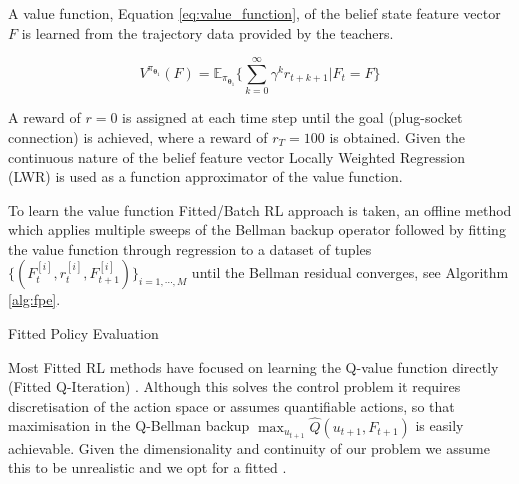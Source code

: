 \documentclass[final,5p,times,twocolumn]{elsarticle}
\makeatletter
\newcommand{\B}{b}
\newcommand{\Param}{\boldsymbol{\theta}}
\newcommand{\removelatexerror}{\let\@latex@error\@gobble}
\makeatother
\begin{document}
A value function, Equation \ref{eq:value_function}, of the belief state feature vector $F$ is  learned from the 
trajectory data provided by the teachers.

\begin{equation}\label{eq:value_function}
  V^{\pi_{\Param_1}}(F) = \mathbb{E}_{\pi_{\Param_1}}\Bigg\{  \sum^{\infty}_{k=0} \gamma^k r_{t+k+1} \Bigg\lvert  F_t=F\Bigg\}
\end{equation}

A reward of ${r=0}$ is assigned at each time step until the goal (plug-socket connection) is achieved, where a 
reward of $r_{T}=100$ is obtained. Given the continuous nature of the belief feature vector Locally Weighted Regression
(LWR) \cite{Atkeson97locallyweighted}  is used as a function approximator of the value function.

To learn the value function Fitted/Batch RL approach is taken\cite{EGW05}, an offline method which applies multiple 
sweeps of the Bellman backup operator followed by fitting the value function through regression to a dataset of 
tuples $\{(F^{[i]}_t,r^{[i]}_t,F^{[i]}_{t+1})\}_{i=1,\cdots,M}$ until the Bellman residual 
converges, see Algorithm \ref{alg:fpe}.

\begin{center}
\begin{minipage}{\linewidth}
\removelatexerror%
\begin{algorithm*}[H]
\label{alg:fpe}
\BlankLine
\While{$||\hat{V}^{\pi}_{k+1}(\B) - \hat{V}^{\pi}_{k}(\B)|| > \epsilon$}{
  $\hat{V}^{\pi}_{k+1}(F)$ = Regress($F_t$, $r_t + \gamma \hat{V}^{\pi}_k(F_{t+1}))$
}
\caption{Fitted Policy Evaluation}
\end{algorithm*} 
\end{minipage}
\end{center}

Most Fitted RL methods have focused on learning the Q-value function directly (Fitted Q-Iteration) 
\cite{NIPS2008_3501,EGW05,Riedmiller2005}. Although this solves the control problem it requires discretisation 
of the action space or assumes quantifiable actions, so that maximisation in the Q-Bellman backup
${\max_{u_{t+1}} \hat{Q}(u_{t+1},F_{t+1})}$ is easily achievable. Given the dimensionality and continuity 
of our problem we assume this to be unrealistic and we opt for a fitted .
\end{document}
